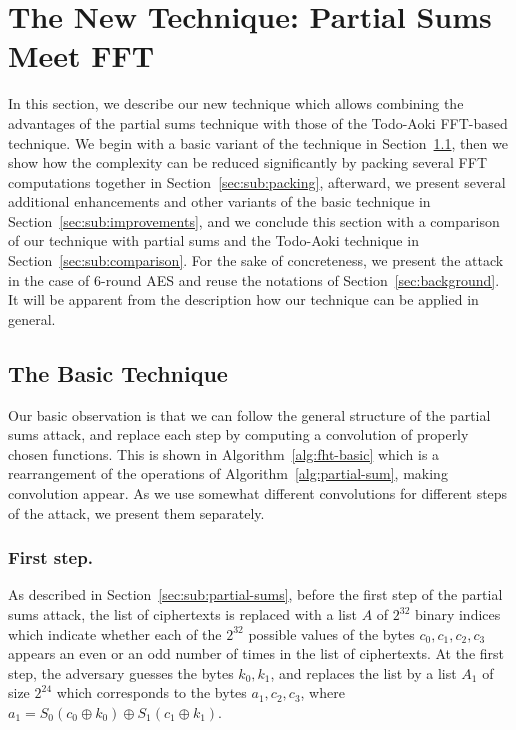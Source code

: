 \section{The New Technique: Partial Sums Meet FFT}\label{sec:new_attack}

In this section, we describe our new technique which allows combining the advantages of the partial sums technique with those of the Todo-Aoki FFT-based technique. We begin with a basic variant of the technique in Section~\ref{sec:sub:basic}, then we show how the complexity can be reduced significantly by packing several FFT computations together in Section~\ref{sec:sub:packing}, afterward, we present several additional enhancements and other variants of the basic technique in Section~\ref{sec:sub:improvements}, and we conclude this section with a comparison of our technique with partial sums and the Todo-Aoki technique in Section~\ref{sec:sub:comparison}. For the sake of concreteness, we present the attack in the case of 6-round AES and reuse the notations of Section~\ref{sec:background}. It will be apparent from the description how our technique can be applied in general.

\subsection{The Basic Technique}\label{sec:sub:basic}

Our basic observation is that we can follow the general structure of the partial sums attack, and replace each step by computing a convolution of properly chosen functions. This is shown in Algorithm~\ref{alg:fht-basic} which is a rearrangement of the operations of Algorithm~\ref{alg:partial-sum}, making convolution appear. As we use somewhat different convolutions for different steps of the attack, we present them separately.  

\subsubsection{First step.} As described in Section~\ref{sec:sub:partial-sums}, before the first step of the partial sums attack, the list of ciphertexts is replaced with a list $A$ of $2^{32}$ binary indices which indicate whether each of the $2^{32}$ possible values of the bytes $c_0,c_1,c_2,c_3$ appears an even or an odd number of times in the list of ciphertexts. At the first step, the adversary guesses the bytes $k_0,k_1$, and replaces the list by a list $A_1$ of size $2^{24}$ which corresponds to the bytes $a_1,c_2,c_3$, where $a_1 = S_0(c_0 \oplus k_0) \oplus S_1(c_1 \oplus k_1)$. 

